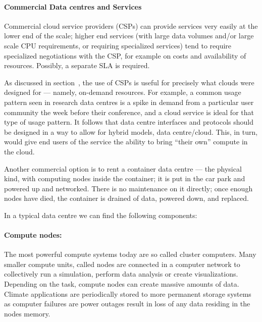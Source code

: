 \paragraph{Commercial Data centres and Services}

Commercial cloud service providers (CSPs) can provide services very easily at the lower end of the scale; higher end services (with large data volumes and/or large scale CPU requirements, or requiring specialized services) tend to require specialized negotiations with the CSP, for example on costs and availability of resources.  Possibly, a separate SLA is required.

As discussed in section~, the use of CSPs is useful for precisely what clouds were designed for --- namely, on-demand resources.  For example, a common usage pattern seen in research data centres is a spike in demand from a particular user community the week before their conference, and a cloud service is ideal for that type of usage pattern.  It follows that data centre interfaces and protocols should be designed in a way to allow for hybrid models, data centre/cloud.  This, in turn, would give end users of the service the ability to bring ``their own'' compute in the cloud.

Another commercial option is to rent a container data centre --- the physical kind, with computing nodes inside the container; it is put in the car park and powered up and networked.  There is no maintenance on it directly; once enough nodes have died, the container is drained of data, powered down, and replaced.

In a typical data centre we can find the following components:

\paragraph{Compute nodes:}
The most powerful compute systems today are so called cluster computers.
Many smaller compute units, called nodes are connected in a computer network to collectively run a simulation, perform data analysis or create visualizations.
Depending on the task, compute nodes can create massive amounts of data.
Climate applications are periodically stored to more permanent storage systems as computer failures are power outages result in loss of any data residing in the nodes memory.


